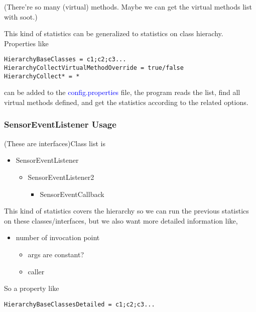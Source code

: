 \documentclass{article}
\begin{document}
(There're so many (virtual) methods. Maybe we can 
get the virtual methods list with soot.)
\par{
This kind of statistics can be generalized to 
statistics on class hierachy.
Properties like
\begin{verbatim}
HierarchyBaseClasses = c1;c2;c3...
HierarchyCollectVirtualMethodOverride = true/false
HierarchyCollect* = *
\end{verbatim}
can be added to the \textcolor{blue}{config.properties} file, 
the program reads the list, find all virtual methods defined,
and get the statistics according to the related options.
}
\subsubsection{SensorEventListener Usage}
(These are interfaces)Class list is 
\begin{itemize}
	\item SensorEventListener
		\begin{itemize}
			\item SensorEventListener2
				\begin{itemize}
					\item SensorEventCallback
				\end{itemize}
		\end{itemize}
\end{itemize}
This kind of statistics covers the hierarchy so 
we can run the previous statistics on these 
classes/interfaces,
but we also want more detailed information like,
\begin{itemize}
	\item number of invocation point
	 	\begin{itemize}
	 		\item args are constant?
	 		\item caller
	 	\end{itemize}
\end{itemize}
So a property like
\begin{verbatim}
HierarchyBaseClassesDetailed = c1;c2;c3...
\end{verbatim}
\end{document}
